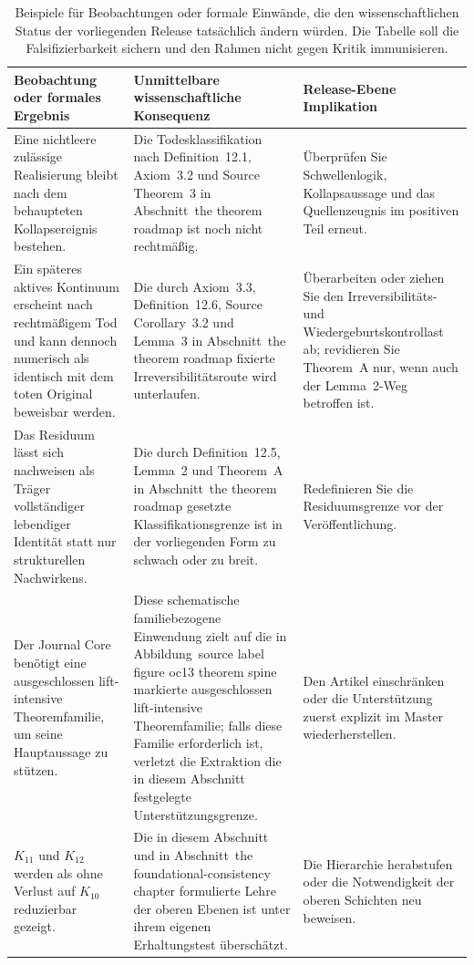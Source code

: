 \begin{table}[htbp]
\centering
\begingroup
\footnotesize
\RaggedRight
\setlength{\tabcolsep}{4pt}
\begin{tabular}{@{}L{0.27\textwidth}L{0.36\textwidth}L{0.22\textwidth}@{}}
\toprule
\textbf{Beobachtung oder formales Ergebnis} & \textbf{Unmittelbare wissenschaftliche Konsequenz} & \textbf{Release-Ebene Implikation} \\
\midrule
Eine nichtleere zulässige Realisierung bleibt nach dem behaupteten Kollapsereignis bestehen. & Die Todesklassifikation nach Definition~12.1, Axiom~3.2 und Source Theorem~3 in Abschnitt~the theorem roadmap ist noch nicht rechtmäßig. & Überprüfen Sie Schwellenlogik, Kollapsaussage und das Quellenzeugnis im positiven Teil erneut. \\
Ein späteres aktives Kontinuum erscheint nach rechtmäßigem Tod und kann dennoch numerisch als identisch mit dem toten Original beweisbar werden. & Die durch Axiom~3.3, Definition~12.6, Source Corollary~3.2 und Lemma~3 in Abschnitt~the theorem roadmap fixierte Irreversibilitätsroute wird unterlaufen. & Überarbeiten oder ziehen Sie den Irreversibilitäts- und Wiedergeburtskontrollast ab; revidieren Sie Theorem~A nur, wenn auch der Lemma~2-Weg betroffen ist. \\
Das Residuum lässt sich nachweisen als Träger vollständiger lebendiger Identität statt nur strukturellen Nachwirkens. & Die durch Definition~12.5, Lemma~2 und Theorem~A in Abschnitt~the theorem roadmap gesetzte
Klassifikationsgrenze ist in der vorliegenden Form zu schwach oder zu breit. & Redefinieren Sie die Residuumsgrenze vor der Veröffentlichung. \\
Der Journal Core benötigt eine ausgeschlossen lift-intensive Theoremfamilie, um seine Hauptaussage zu
stützen. & Diese schematische familiebezogene Einwendung zielt auf die in
Abbildung~source label figure oc13 theorem spine markierte ausgeschlossen lift-intensive Theoremfamilie; falls diese
Familie erforderlich ist, verletzt die Extraktion die in diesem Abschnitt festgelegte Unterstützungsgrenze. & Den Artikel einschränken oder die Unterstützung zuerst explizit im Master wiederherstellen. \\
\(K_{11}\) und \(K_{12}\) werden als ohne Verlust auf \(K_{10}\) reduzierbar gezeigt. & Die in diesem Abschnitt und in Abschnitt~the foundational-consistency chapter formulierte Lehre der oberen Ebenen ist
unter ihrem eigenen Erhaltungstest überschätzt. & Die Hierarchie herabstufen oder die Notwendigkeit der oberen Schichten neu beweisen. \\
\bottomrule
\end{tabular}
\endgroup
\caption{Beispiele für Beobachtungen oder formale Einwände, die den wissenschaftlichen Status der
vorliegenden Release tatsächlich ändern würden. Die Tabelle soll die Falsifizierbarkeit sichern und den Rahmen
nicht gegen Kritik immunisieren.}
\label{tab:oc13-counterexamples}
\end{table}


